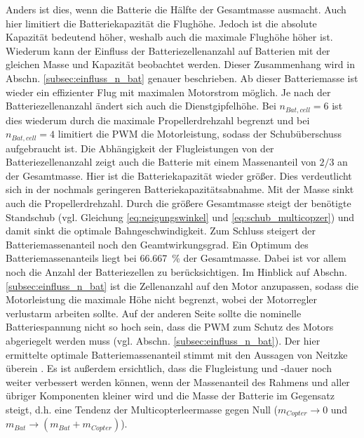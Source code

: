 Anders ist dies, wenn die Batterie die Hälfte der Gesamtmasse ausmacht. Auch hier limitiert die Batteriekapazität die Flughöhe. Jedoch ist die absolute Kapazität bedeutend höher, weshalb auch die maximale Flughöhe höher ist. Wiederum kann der Einfluss der Batteriezellenanzahl auf Batterien mit der gleichen Masse und Kapazität beobachtet werden. Dieser Zusammenhang wird in Abschn. \ref{subsec:einfluss_n_bat} genauer beschrieben. Ab dieser Batteriemasse ist wieder ein effizienter Flug mit maximalen Motorstrom möglich. Je nach der Batteriezellenanzahl ändert sich auch die Dienstgipfelhöhe. Bei \ensuremath{n_{Bat,cell} = 6} ist dies wiederum durch die maximale Propellerdrehzahl begrenzt und bei \ensuremath{n_{Bat,cell} = 4} limitiert die PWM die Motorleistung, sodass der Schubüberschuss aufgebraucht ist. Die Abhängigkeit der Flugleistungen von der Batteriezellenanzahl zeigt auch die Batterie mit einem Massenanteil von \ensuremath{2/3} an der Gesamtmasse. Hier ist die Batteriekapazität wieder größer. Dies verdeutlicht sich in der nochmals geringeren Batteriekapazitätsabnahme. Mit der Masse sinkt auch die Propellerdrehzahl. Durch die größere Gesamtmasse steigt der benötigte Standschub (vgl. Gleichung \ref{eq:neigungswinkel} und \ref{eq:schub_multicopzer}) und damit sinkt die optimale Bahngeschwindigkeit.
Zum Schluss steigert der Batteriemassenanteil noch den Geamtwirkungsgrad. 
Ein Optimum des Batteriemassenanteils liegt bei \SI{66,667}{\%} der Gesamtmasse. Dabei ist vor allem noch die Anzahl der Batteriezellen zu berücksichtigen. Im Hinblick auf Abschn. \ref{subsec:einfluss_n_bat} ist die Zellenanzahl auf den Motor anzupassen, sodass die Motorleistung die maximale Höhe nicht begrenzt, wobei der Motorregler verlustarm arbeiten sollte. Auf der anderen Seite sollte die nominelle Batteriespannung nicht so hoch sein, dass die PWM zum Schutz des Motors abgeriegelt werden muss (vgl. Abschn. \ref{subsec:einfluss_n_bat}). 
Der hier ermittelte optimale Batteriemassenanteil stimmt mit den Aussagen von Neitzke überein \cite{Neitzke.2013}.
Es ist außerdem ersichtlich, dass die Flugleistung und -dauer noch weiter verbessert werden können, wenn der Massenanteil des Rahmens und aller übriger Komponenten kleiner wird und die Masse der Batterie im Gegensatz steigt, d.h. eine Tendenz der Multicopterleermasse gegen Null (\ensuremath{m_{Copter}\rightarrow 0} und \ensuremath{m_{Bat}\rightarrow (m_{Bat}+m_{Copter})}).



